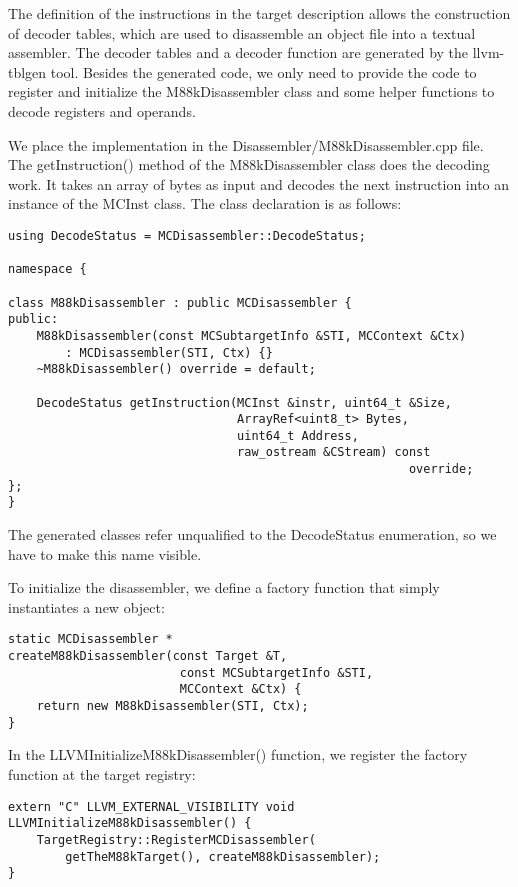 The definition of the instructions in the target description allows the construction of decoder tables, which are used to disassemble an object file into a textual assembler. The decoder tables and a decoder function are generated by the llvm-tblgen tool. Besides the generated code, we only need to provide the code to register and initialize the M88kDisassembler class and some helper functions to decode registers and operands.\par

We place the implementation in the Disassembler/M88kDisassembler.cpp file. The getInstruction() method of the M88kDisassembler class does the decoding work. It takes an array of bytes as input and decodes the next instruction into an instance of the MCInst class. The class declaration is as follows:\par

\begin{lstlisting}[caption={}]
using DecodeStatus = MCDisassembler::DecodeStatus;

namespace {
	
class M88kDisassembler : public MCDisassembler {
public:
	M88kDisassembler(const MCSubtargetInfo &STI, MCContext &Ctx)
		: MCDisassembler(STI, Ctx) {}
	~M88kDisassembler() override = default;
	
	DecodeStatus getInstruction(MCInst &instr, uint64_t &Size,
								ArrayRef<uint8_t> Bytes,
								uint64_t Address,
								raw_ostream &CStream) const
														override;
};
}
\end{lstlisting}

The generated classes refer unqualified to the DecodeStatus enumeration, so we have to make this name visible. \par

To initialize the disassembler, we define a factory function that simply instantiates a new object:\par

\begin{lstlisting}[caption={}]
static MCDisassembler *
createM88kDisassembler(const Target &T,
						const MCSubtargetInfo &STI,
						MCContext &Ctx) {
	return new M88kDisassembler(STI, Ctx);
}
\end{lstlisting}

In the LLVMInitializeM88kDisassembler() function, we register the factory function at the target registry:\par

\begin{lstlisting}[caption={}]
extern "C" LLVM_EXTERNAL_VISIBILITY void
LLVMInitializeM88kDisassembler() {
	TargetRegistry::RegisterMCDisassembler(
		getTheM88kTarget(), createM88kDisassembler);
}
\end{lstlisting}

